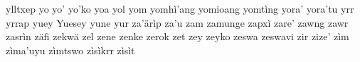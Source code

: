 ylltxep\hspace{2mm}
yo\hspace{2mm}
yo'\hspace{2mm}
yo'ko\hspace{2mm}
yoa\hspace{2mm}
yol\hspace{2mm}
yom\hspace{2mm}
yomhì'ang\hspace{2mm}
yomioang\hspace{2mm}
yomtìng\hspace{2mm}
yora'\hspace{2mm}
yora'tu\hspace{2mm}
yrr\hspace{2mm}
yrrap\hspace{2mm}
yuey\hspace{2mm}
Yuesey\hspace{2mm}
yune\hspace{2mm}
yur\hspace{2mm}
za'ärìp\hspace{2mm}
za'u\hspace{2mm}
zam\hspace{2mm}
zamunge\hspace{2mm}
zapxì\hspace{2mm}
zare'\hspace{2mm}
zawng\hspace{2mm}
zawr\hspace{2mm}
zasrìn\hspace{2mm}
zäfi\hspace{2mm}
zekwä\hspace{2mm}
zel\hspace{2mm}
zene\hspace{2mm}
zenke\hspace{2mm}
zerok\hspace{2mm}
zet\hspace{2mm}
zey\hspace{2mm}
zeyko\hspace{2mm}
zeswa\hspace{2mm}
zeswavi\hspace{2mm}
zir\hspace{2mm}
zize'\hspace{2mm}
zìm\hspace{2mm}
zìma'uyu\hspace{2mm}
zìmtswo\hspace{2mm}
zìsìkrr\hspace{2mm}
zìsìt\hspace{2mm}
